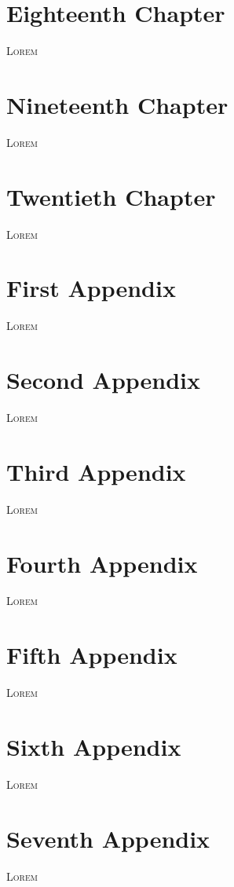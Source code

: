 \documentclass[a4paper,oneside,11pt]{memoir}
\begin{document}
\chapter{Eighteenth Chapter}
\lettrine{\textcolor[gray]{0.5}{L}}{orem} \lipsum[1-3]

\chapter{Nineteenth Chapter}
\lettrine{\textcolor[gray]{0.5}{L}}{orem} \lipsum[1-3]

\chapter{Twentieth Chapter}
\lettrine{\textcolor[gray]{0.5}{L}}{orem} \lipsum[1-3]

\appendixpage
\appendix
{}
\chapter{First Appendix}
\lettrine{\textcolor[gray]{0.5}{L}}{orem} \lipsum[1-2]

\chapter{Second Appendix}
\lettrine{\textcolor[gray]{0.5}{L}}{orem} \lipsum[1-2]

\chapter{Third Appendix}
\lettrine{\textcolor[gray]{0.5}{L}}{orem} \lipsum[1-2]

\chapter{Fourth Appendix}
\lettrine{\textcolor[gray]{0.5}{L}}{orem} \lipsum[1-2]

\chapter{Fifth Appendix}
\lettrine{\textcolor[gray]{0.5}{L}}{orem} \lipsum[1-2]

\chapter{Sixth Appendix}
\lettrine{\textcolor[gray]{0.5}{L}}{orem} \lipsum[1-2]

\chapter{Seventh Appendix}
\lettrine{\textcolor[gray]{0.5}{L}}{orem} \lipsum[1-2]
\end{document}
